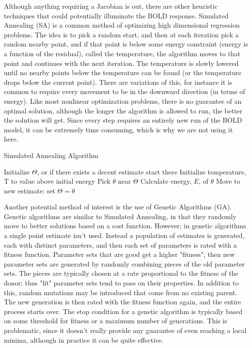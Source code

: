 Although anything requiring a Jacobian is out, there are other heuristic
techniques that could potentially illuminate the BOLD response. 
Simulated Annealing (SA) is a common method of optimizing high dimensional
regression problems. The idea is to pick a random start, and then
at each iteration pick a random nearby point, and if that point is
below some energy constraint (energy is a function of the residual), 
called the temperature, the algorithm moves
to that point and continues with the next iteration. The temperature
is slowly lowered until no nearby points below the temperature can
be found (or the temperature drops below the current point). There are
variations of this, for instance it is common to require every movement
to be in the downward direction (in terms of energy). Like most nonlinear
optimization problems, there is no guarantee of an optimal solution,
although the longer the algorithm is allowed to run, the better the solution
will get. Since every step requires an entirely new run of the 
BOLD model, it can be extremely time consuming, which is why we are
not using it here.

\begin{algorithm}
\caption{Simulated Annealing Algorithm}
\label{alg:Simulated Annealing}
\begin{algorithmic}
\STATE Initialize $\Theta$, or if there exists a decent estimate start there
\STATE Initialize temperature, T to value above initial energy
    \REPEAT
        \STATE Pick $\theta$ near $\Theta$
        \STATE Calculate energy, $E$, of $\theta$
    \STATE Move to new estimate: set $\Theta = \theta$
\ENDWHILE
\end{algorithmic}
\end{algorithm}


Another potential method of interest is the use of Genetic Algorithms
(GA). Genetic algorithms are similar to Simulated Annealing, in
that they randomly move to better solutions based on a cost function.
However; in genetic algorithms a single point estimate isn't used. Instead
a population of estimates is generated, each with distinct parameters,
and then each set of parameters is rated with a fitness function. Parameter
sets that are good get a higher "fitness"; then new parameter sets are generated by 
randomly combining pieces of the old parameter sets. The pieces are typically
chosen at a rate proportional to the fitness of the donor; thus "fit"
parameter sets tend to pass on their properties. In addition to this,
random mutations may be introduced that come from no existing parent. 
The new generation is then rated with the fitness function again, and
the entire process starts over. The stop condition for a genetic algorithm
is typically based on some threshold for fitness or a maximum number 
of generations. This is problematic, since it doesn't really provide 
any guarantee of even reaching a local minima, although in practice
it can be quite effective.

